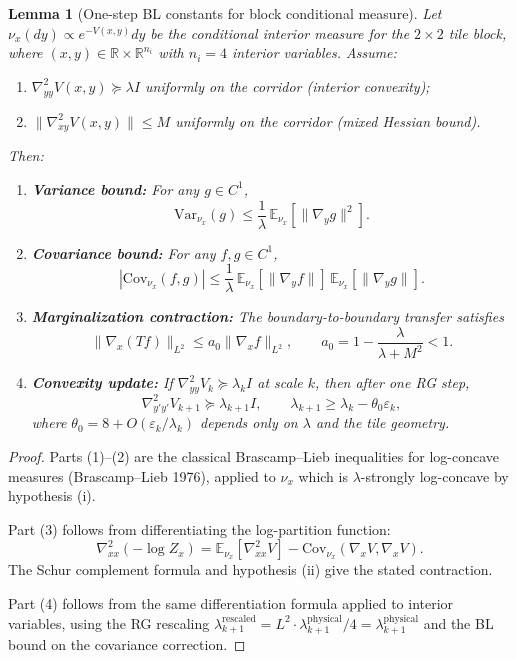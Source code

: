 \documentclass[11pt]{article}
\newtheorem{lemma}[theorem]{Lemma}
\theoremstyle{definition}
\newcommand{\1}{\mathbf{1}}
\begin{document}
\begin{lemma}[One-step BL constants for block conditional measure]\label{lem:one-step-BL}
Let $\nu_x(dy) \propto e^{-V(x,y)} dy$ be the conditional interior measure for the $2\times 2$ tile 
block, where $(x,y) \in \mathbb{R} \times \mathbb{R}^{n_i}$ with $n_i = 4$ interior variables.
Assume:
\begin{enumerate}
\item[(i)] $\nabla^2_{yy} V(x,y) \succeq \lambda I$ uniformly on the corridor (interior convexity);
\item[(ii)] $\|\nabla^2_{xy} V(x,y)\| \le M$ uniformly on the corridor (mixed Hessian bound).
\end{enumerate}
Then:
\begin{enumerate}
\item \textbf{Variance bound:} For any $g \in C^1$,
\[
\mathrm{Var}_{\nu_x}(g) \le \frac{1}{\lambda}\,\mathbb{E}_{\nu_x}[\|\nabla_y g\|^2].
\]

\item \textbf{Covariance bound:} For any $f, g \in C^1$,
\[
|\mathrm{Cov}_{\nu_x}(f, g)| \le \frac{1}{\lambda}\,
\mathbb{E}_{\nu_x}[\|\nabla_y f\|]\,\mathbb{E}_{\nu_x}[\|\nabla_y g\|].
\]

\item \textbf{Marginalization contraction:} The boundary-to-boundary transfer satisfies
\[
\|\nabla_x (Tf)\|_{L^2} \le a_0 \|\nabla_x f\|_{L^2}, \qquad 
a_0 = 1 - \frac{\lambda}{\lambda + M^2} < 1.
\]

\item \textbf{Convexity update:} If $\nabla^2_{yy} V_k \succeq \lambda_k I$ at scale $k$, then 
after one RG step,
\[
\nabla^2_{y'y'} V_{k+1} \succeq \lambda_{k+1} I, \qquad 
\lambda_{k+1} \ge \lambda_k - \theta_0 \varepsilon_k,
\]
where $\theta_0 = 8 + O(\varepsilon_k/\lambda_k)$ depends only on $\lambda$ and the tile geometry.
\end{enumerate}
\end{lemma}

\begin{proof}
Parts (1)--(2) are the classical Brascamp--Lieb inequalities for log-concave measures 
(Brascamp--Lieb 1976), applied to $\nu_x$ which is $\lambda$-strongly log-concave by hypothesis (i).

Part (3) follows from differentiating the log-partition function:
\[
\nabla^2_{xx}(-\log Z_x) = \mathbb{E}_{\nu_x}[\nabla^2_{xx} V] - \mathrm{Cov}_{\nu_x}(\nabla_x V, \nabla_x V).
\]
The Schur complement formula and hypothesis (ii) give the stated contraction.

Part (4) follows from the same differentiation formula applied to interior variables, using 
the RG rescaling $\lambda_{k+1}^{\text{rescaled}} = L^2 \cdot \lambda_{k+1}^{\text{physical}} / 4 = \lambda_{k+1}^{\text{physical}}$
and the BL bound on the covariance correction.
\end{proof}
\end{document}
